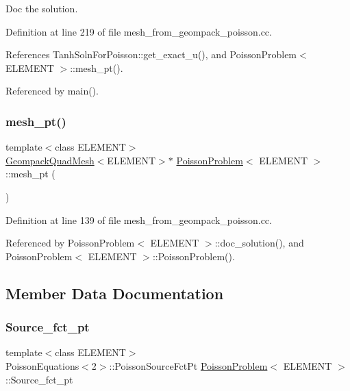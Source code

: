 Doc the solution. 



Definition at line 219 of file mesh\+\_\+from\+\_\+geompack\+\_\+poisson.\+cc.



References Tanh\+Soln\+For\+Poisson\+::get\+\_\+exact\+\_\+u(), and Poisson\+Problem$<$ E\+L\+E\+M\+E\+N\+T $>$\+::mesh\+\_\+pt().



Referenced by main().

\mbox{\label{classPoissonProblem_a8191a1eb8d55778aa7264856285b5d7f}} 
\subsubsection{\texorpdfstring{mesh\+\_\+pt()}{mesh\_pt()}}
{\footnotesize\ttfamily template$<$class E\+L\+E\+M\+E\+NT$>$ \\
\hyperlink{classoomph_1_1GeompackQuadMesh}{Geompack\+Quad\+Mesh}$<$E\+L\+E\+M\+E\+NT$>$$\ast$ \hyperlink{classPoissonProblem}{Poisson\+Problem}$<$ E\+L\+E\+M\+E\+NT $>$\+::mesh\+\_\+pt (\begin{DoxyParamCaption}{ }\end{DoxyParamCaption})\hspace{0.3cm}{\ttfamily [inline]}}



Definition at line 139 of file mesh\+\_\+from\+\_\+geompack\+\_\+poisson.\+cc.



Referenced by Poisson\+Problem$<$ E\+L\+E\+M\+E\+N\+T $>$\+::doc\+\_\+solution(), and Poisson\+Problem$<$ E\+L\+E\+M\+E\+N\+T $>$\+::\+Poisson\+Problem().



\subsection{Member Data Documentation}
\mbox{\label{classPoissonProblem_a32b954cca3c38175d0816f92e1c0da46}} 
\subsubsection{\texorpdfstring{Source\+\_\+fct\+\_\+pt}{Source\_fct\_pt}}
{\footnotesize\ttfamily template$<$class E\+L\+E\+M\+E\+NT$>$ \\
Poisson\+Equations$<$2$>$\+::Poisson\+Source\+Fct\+Pt \hyperlink{classPoissonProblem}{Poisson\+Problem}$<$ E\+L\+E\+M\+E\+NT $>$\+::Source\+\_\+fct\+\_\+pt\hspace{0.3cm}{\ttfamily [private]}}



